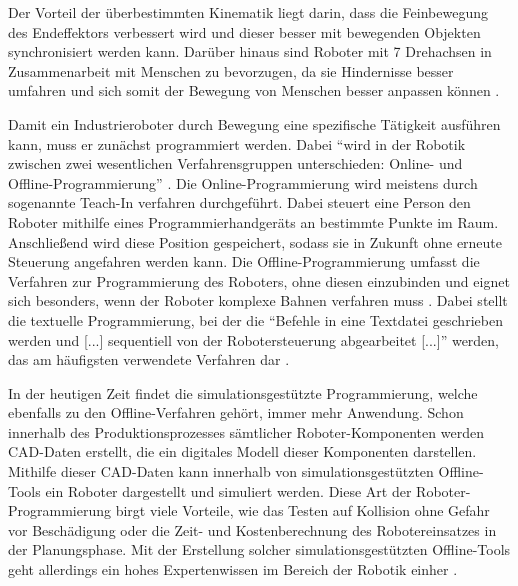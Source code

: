 \vspace{1em}



Der Vorteil der überbestimmten Kinematik liegt darin, dass die Feinbewegung des Endeffektors verbessert wird und dieser besser mit bewegenden Objekten synchronisiert werden kann.
Darüber hinaus sind Roboter mit 7 Drehachsen in Zusammenarbeit mit Menschen zu bevorzugen,
da sie Hindernisse besser umfahren und sich somit der Bewegung von Menschen besser anpassen können
.

Damit ein Industrieroboter durch Bewegung eine spezifische Tätigkeit ausführen kann, muss er zunächst programmiert werden.
Dabei \enquote{wird in der Robotik zwischen zwei wesentlichen Verfahrensgruppen unterschieden: Online- und Offline-\-Pro\-grammie\-rung} .
Die Online-Programmierung wird meistens durch sogenannte Teach-In verfahren durchgeführt. Dabei steuert eine Person den Roboter mithilfe eines Programmierhandgeräts
an bestimmte Punkte im Raum. Anschließend wird diese Position gespeichert, sodass sie in Zukunft ohne erneute Steuerung angefahren werden kann.
Die Offline-Programmierung umfasst die Verfahren zur Programmierung des Roboters, ohne diesen einzubinden und eignet sich besonders, wenn der Roboter komplexe Bahnen verfahren muss
.
Dabei stellt die textuelle Programmierung, bei der die \enquote{Befehle in eine Textdatei geschrieben werden und [...] sequentiell von der Robotersteuerung abgearbeitet [...]} werden,
das am häufigsten verwendete Verfahren dar
. 

In der heutigen Zeit findet die simulationsgestützte Programmierung, welche ebenfalls zu den Offline-Verfahren gehört, immer mehr Anwendung.     %
Schon innerhalb des Produktionsprozesses sämtlicher Roboter-Komponenten werden CAD-Daten erstellt, die ein digitales Modell dieser Komponenten darstellen.
Mithilfe dieser CAD-Daten kann innerhalb von simulationsgestützten Offline-Tools ein Roboter dargestellt und simuliert werden.
Diese Art der Roboter-Programmierung birgt viele Vorteile, wie das Testen auf Kollision ohne Gefahr vor Beschädigung oder die Zeit- und Kostenberechnung des Robotereinsatzes in der Planungsphase.
Mit der Erstellung solcher simulationsgestützten Offline-Tools geht allerdings ein hohes Expertenwissen im Bereich der Robotik einher
. 




